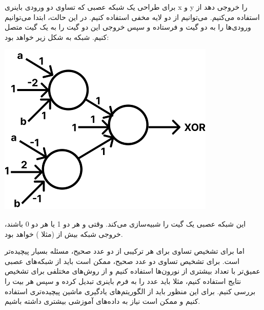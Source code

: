 برای طراحی یک شبکه عصبی که تساوی دو ورودی باینری x و y را خروجی دهد از
استفاده می‌کنیم.
می‌توانیم از دو لایه مخفی استفاده کنیم. در این حالت، ابتدا می‌توانیم ورودی‌ها را به دو گیت
و
فرستاده و سپس خروجی این دو گیت را به یک گیت 
متصل کنیم. شبکه به شکل زیر خواهد بود:

\begin{center}
	\includegraphics{pic}
\end{center}

این شبکه عصبی یک گیت
را شبیه‌سازی می‌کند. وقتی
و
هر دو 1 یا هر دو 0 باشند، خروجی شبکه بیش از
(مثلا
 ) خواهد بود.

اما برای تشخیص تساوی برای هر ترکیبی از دو عدد صحیح، مسئله بسیار پیچیده‌تر است. برای تشخیص تساوی دو عدد صحیح، ممکن است باید از شبکه‌های عصبی عمیق‌تر با تعداد بیشتری از نورون‌ها استفاده کنیم و از روش‌های مختلفی برای تشخیص نتایج استفاده کنیم، مثلا باید عدد را به فرم باینری تبدیل کرده و سپس هر بیت را بررسی کنیم. برای این منظور باید از الگوریتم‌های یادگیری ماشین پیچیده‌تری استفاده کنیم و ممکن است نیاز به داده‌های آموزشی بیشتری داشته باشیم.